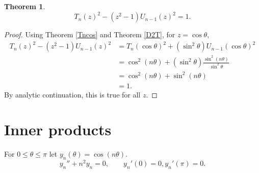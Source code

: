 \documentclass{article}
\newtheorem{theorem}{Theorem}
\theoremstyle{definition}
\begin{document}
\begin{theorem}
\[
T_n(z)^2- (z^2-1)U_{n-1}(z)^2=1.
\]
\label{pell}
\end{theorem}
\begin{proof}
Using Theorem \ref{Tncos} and Theorem \ref{D2T}, for $z=\cos \theta$,
\begin{align*}
T_n(z)^2-(z^2-1)U_{n-1}(z)^2&=
T_n(\cos \theta)^2 + (\sin^2\theta) U_{n-1}(\cos \theta)^2\\
&=\cos^2(n\theta)+(\sin^2 \theta) \frac{\sin^2(n\theta)}{\sin^2\theta}\\
&=\cos^2(n\theta)+\sin^2(n\theta)\\
&=1.
\end{align*}
By analytic continuation, this is true for all $z$. 
\end{proof}







\section{Inner products}
For $0 \leq \theta \leq \pi$ let $y_n(\theta) = \cos(n\theta)$. 
\[
y_n''+n^2y_n=0,\qquad y_n'(0)=0,y_n'(\pi)=0.
\]
\end{document}
